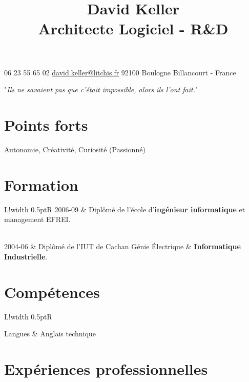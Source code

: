 \documentclass[10pt]{article}
\newcommand{\VRule}{\color{lightgray}\vrule width 0.5pt}
\begin{document}
\title{\bfseries{\Huge David Keller} \\ Architecte Logiciel - R\&D}
\date{}
\author{}

\maketitle

\begin{center}
\faPhone \hspace{1pt} 06 23 55 65 02
\hspace{5pt} 
\faAt \hspace{1pt} \href{mailto:david.keller@litchis.fr}{david.keller@litchis.fr}
\hspace{5pt} 
\faMapMarker \hspace{1pt} 92100 Boulogne Billancourt - France
\end{center}

\begin{center}
"\textit{Ils ne savaient pas que c’était impossible, alors ils l’ont fait.}"
\end{center}

\section*{Points forts}
Autonomie, Créativité, Curiosité (Passionné)

\section*{Formation}
\begin{longtable}{L!{\VRule}R}
2006-09
& Diplômé de l'école d'\textbf{ingénieur informatique} et management EFREI.

\\
2004-06
& Diplômé de l'IUT de Cachan Génie Électrique \& \textbf{Informatique Industrielle}.
\end{longtable}

\section*{Compétences}
\begin{longtable}{L!{\VRule}R}

Langues
& Anglais technique
\end{longtable}

\clearpage

\section*{Expériences professionnelles}
\end{document}
